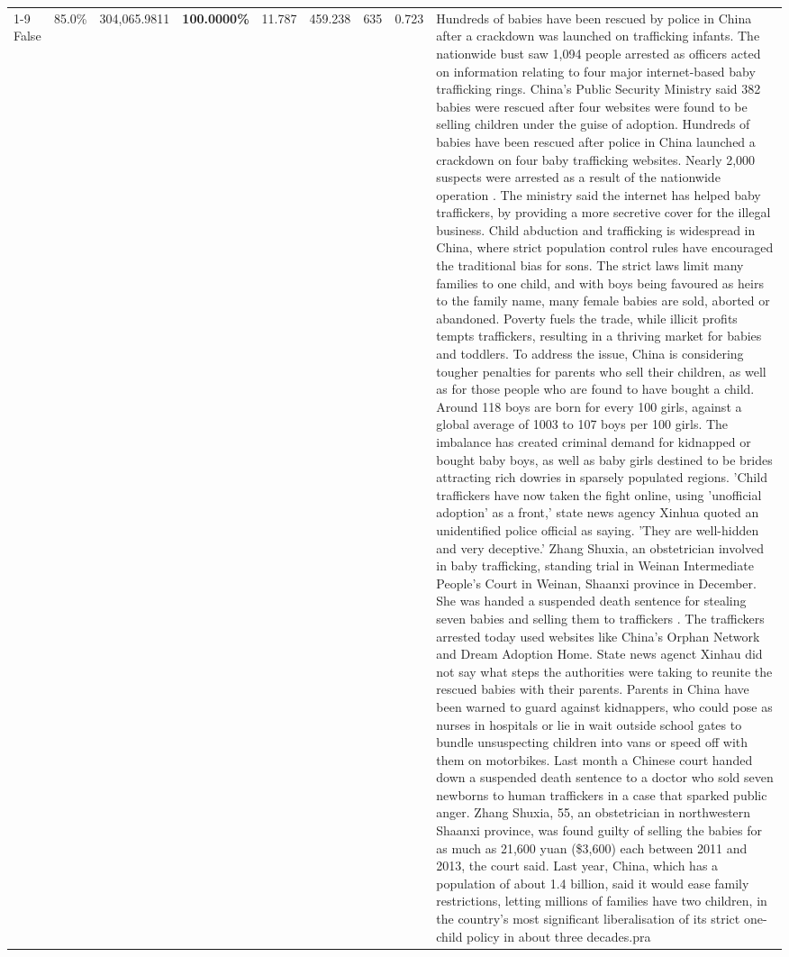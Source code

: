 \begin{table}[H]
\begin{tabular}{lllrlllll}
\cline{1-9}
False & 85.0\% & 304,065.9811 & \bfseries \color{red} 100.0000\% & 11.787 & 459.238 & 635 & 0.723 & Hundreds of babies have been rescued by police in China after a crackdown was launched on trafficking infants. The nationwide bust saw 1,094 people arrested as officers acted on information relating to four major internet-based baby trafficking rings. China's Public Security Ministry said 382 babies were rescued after four websites were found to be selling children under the guise of adoption. Hundreds of babies have been rescued after police in China launched a crackdown on four baby trafficking websites. Nearly 2,000 suspects were arrested as a result of the nationwide operation . The ministry said the internet has helped baby traffickers, by providing a more secretive cover for the illegal business. Child abduction and trafficking is widespread in China, where strict population control rules have encouraged the traditional bias for sons. The strict laws limit many families to one child, and with boys being favoured as heirs to the family name, many female babies are sold, aborted or abandoned. Poverty fuels the trade, while illicit profits tempts traffickers, resulting in a thriving market for babies and toddlers. To address the issue, China is considering tougher penalties for parents who sell their children, as well as for those people who are found to have bought a child. Around 118 boys are born for every 100 girls, against a global average of 1003 to 107 boys per 100 girls. The imbalance has created criminal demand for kidnapped or bought baby boys, as well as baby girls destined to be brides attracting rich dowries in sparsely populated regions. 'Child traffickers have now taken the fight online, using 'unofficial adoption' as a front,' state news agency Xinhua quoted an unidentified police official as saying. 'They are well-hidden and very deceptive.' Zhang Shuxia, an obstetrician involved in baby trafficking, standing trial in Weinan Intermediate People's Court in Weinan, Shaanxi province in December. She was handed a suspended death sentence for stealing seven babies and selling them to traffickers . The traffickers arrested today used websites like China's Orphan Network and Dream Adoption Home. State news agenct Xinhau did not say what steps the authorities were taking to reunite the rescued babies with their parents. Parents in China have been warned to guard against kidnappers, who could pose as nurses in hospitals or lie in wait outside school gates to bundle unsuspecting children into vans or speed off with them on motorbikes. Last month a Chinese court handed down a suspended death sentence to a doctor who sold seven newborns to human traffickers in a case that sparked public anger. Zhang Shuxia, 55, an obstetrician in northwestern Shaanxi province, was found guilty of selling the babies for as much as 21,600 yuan (\$3,600) each between 2011 and 2013, the court said. Last year, China, which has a population of about 1.4 billion, said it would ease family restrictions, letting millions of families have two children, in the country's most significant liberalisation of its strict one-child policy in about three decades.pra \\

\end{tabular}
\end{table}
